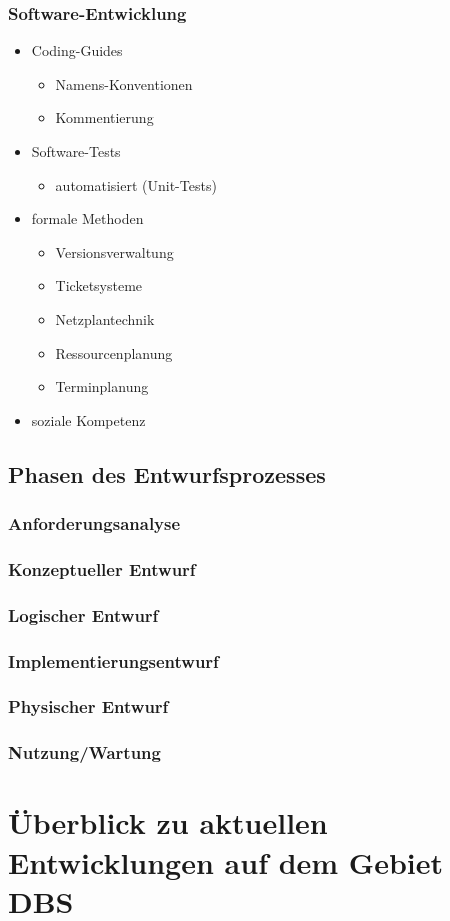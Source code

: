 \subsection{Software-Entwicklung}
\begin{itemize}
\item Coding-Guides
\begin{itemize}
\item Namens-Konventionen
\item Kommentierung
\end{itemize}
\item Software-Tests
\begin{itemize}
\item automatisiert (Unit-Tests)
\end{itemize}
\item formale Methoden
\begin{itemize}
\item Versionsverwaltung
\item Ticketsysteme
\item Netzplantechnik
\item Ressourcenplanung
\item Terminplanung
\end{itemize}
\item soziale Kompetenz
\end{itemize}
\section{Phasen des Entwurfsprozesses}
\subsection{Anforderungsanalyse}
\subsection{Konzeptueller Entwurf}
\subsection{Logischer Entwurf}
\subsection{Implementierungsentwurf}
\subsection{Physischer Entwurf}
\subsection{Nutzung/Wartung}

\chapter{Überblick zu aktuellen Entwicklungen auf dem Gebiet DBS}


